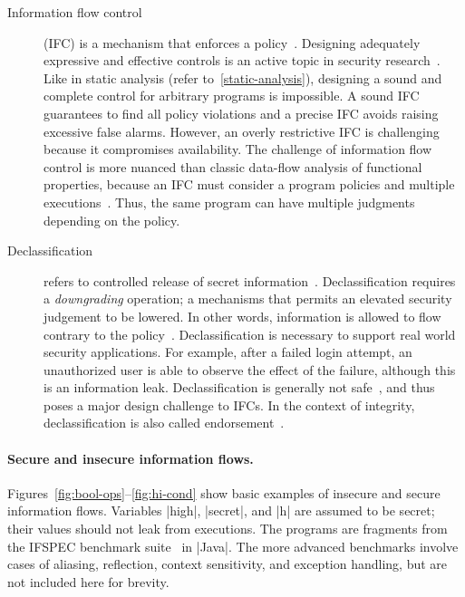 \begin{description}
\item[Information flow control] (IFC)
is a mechanism that enforces a {policy}~\cite{bishop2003}.
Designing adequately expressive and effective controls is an active topic in security research~\cite{vandermeyden2007,bossi2005,sabelfeld2003}.
Like in static analysis (refer to~\autoref{static-analysis}), designing a sound and complete control for arbitrary programs is impossible.
A sound IFC guarantees to find all policy violations and a precise IFC avoids raising excessive false alarms.
However, an overly restrictive IFC is challenging because it compromises availability.
The challenge of information flow control is more nuanced than classic data-flow analysis of functional properties,
because an IFC must consider a program \wrt policies and multiple executions~\cite{frumin2021}.
Thus, the same program can have multiple judgments depending on the policy.

\item[Declassification]
refers to controlled release of secret information~\cite{sabelfeld2009}.
Declassification requires a \emph{downgrading} operation;
a mechanisms that permits an elevated security judgement to be lowered.
In other words, information is allowed to flow contrary to the {policy}~\cite{cecchetti2017}.
Declassification is necessary to support real world security applications.
For example, after a failed login attempt, an unauthorized user is able to observe the effect of the failure, 
although this is an information leak.
Declassification is generally not safe~\cite{derakhshan2024}, 
and thus poses a major design challenge to IFCs.
In the context of integrity, declassification is also called {endorsement}~\cite{marion2011}.

\end{description}

\paragraph*{Secure and insecure information flows.}
Figures~\ref{fig:bool-ops}--\ref{fig:hi-cond} show basic examples of insecure and secure information flows.
Variables \pr|high|, \pr|secret|, and \pr|h| are assumed to be secret;
their values should not leak from executions.
The programs are fragments from the {IFSPEC benchmark suite}~\cite{hamann2018,ifspec} in \pr|Java|.
The more advanced benchmarks involve cases of aliasing, reflection, context sensitivity, and exception handling,
 but are not included here for brevity.

